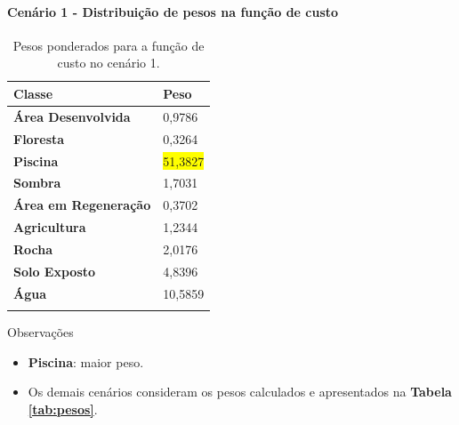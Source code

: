 \documentclass[%
  10pt,%
  aspectratio = 169,%
  compress,%
  t,%
  english,%
  brazilian,%
  tikz,
]{beamer}
\begin{document}
\begin{frame}
\framesubtitle{Cenário 1 - Distribuição de pesos na função de custo}

\begin{table}[!ht]
    \centering
    \caption{Pesos ponderados para a função de custo no cenário 1.}%
    \label{tab:res:cen1:pesos}%
    \begin{tabular}{ll}
    \toprule
        \textbf{Classe}                     & \textbf{Peso} \\ \midrule
        \textbf{Área Desenvolvida}          & 0,9786 \\ 
        \textbf{Floresta}                   & 0,3264 \\ 
        \textbf{Piscina}                    & \colorbox{yellow}{51,3827} \\ 
        \textbf{Sombra}                     & 1,7031 \\ 
        \textbf{Área em Regeneração}        & 0,3702 \\ 
        \textbf{Agricultura}                & 1,2344 \\ 
        \textbf{Rocha}                      & 2,0176 \\ 
        \textbf{Solo Exposto}               & 4,8396 \\ 
        \textbf{Água}                       & 10,5859 \\
        \bottomrule
        \addlinespace
    \end{tabular}
\end{table}

\begin{block}{Observações}
    \begin{itemize}
        \item \textbf{Piscina}: maior peso.
        \item Os demais cenários consideram os pesos calculados e apresentados na \textbf{Tabela \ref{tab:pesos}}.
    \end{itemize}
\end{block}
\end{frame}
\end{document}
